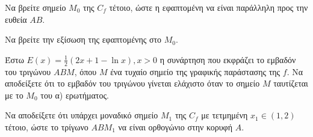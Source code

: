 \begin{alist}
\item
    \begin{rlist}
    \item Να βρείτε σημείο $M_0$ της $C_f$ τέτοιο, ώστε η εφαπτομένη να είναι παράλληλη προς την ευθεία $AB$. 
    \item Να βρείτε την εξίσωση της εφαπτομένης στο $M_0$. 
    \end{rlist}
\item Έστω $E(x) = \frac{1}{2}(2x + 1 - \ln x), x > 0$ η συνάρτηση που εκφράζει το εμβαδόν του τριγώνου $ABM$, όπου $M$ ένα τυχαίο σημείο της γραφικής παράστασης της $f$. Να αποδείξετε ότι το εμβαδόν του τριγώνου γίνεται ελάχιστο όταν το σημείο $M$ ταυτίζεται με το $M_0$ του α) ερωτήματος. 
\item Να αποδείξετε ότι υπάρχει μοναδικό σημείο $M_1$ της $C_f$ με τετμημένη $x_1 \in (1,2)$ τέτοιο, ώστε το τρίγωνο $ABM_1$ να είναι ορθογώνιο στην κορυφή $A$. 
\end{alist}